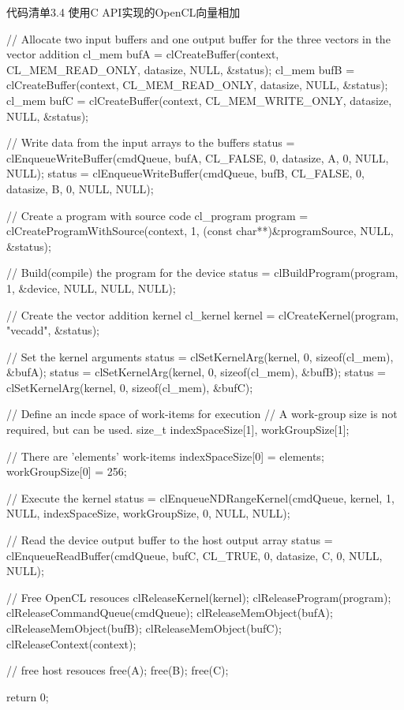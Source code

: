 \begin{codeboxt}[cpp]{代码清单3.4 使用C API实现的OpenCL向量相加}
{  // Allocate two input buffers and one output buffer for the three vectors in the vector addition
  cl_mem bufA = clCreateBuffer(context, CL_MEM_READ_ONLY, datasize, NULL, &status);
  cl_mem bufB = clCreateBuffer(context, CL_MEM_READ_ONLY, datasize, NULL, &status);
  cl_mem bufC = clCreateBuffer(context, CL_MEM_WRITE_ONLY, datasize, NULL, &status);

  // Write data from the input arrays to the buffers
  status = clEnqueueWriteBuffer(cmdQueue, bufA, CL_FALSE, 0, datasize, A, 0, NULL, NULL);
  status = clEnqueueWriteBuffer(cmdQueue, bufB, CL_FALSE, 0, datasize, B, 0, NULL, NULL);

  // Create a program with source code
  cl_program program = clCreateProgramWithSource(context, 1, (const char**)&programSource, NULL, &status);

  // Build(compile) the program for the device
  status = clBuildProgram(program, 1, &device, NULL, NULL, NULL);

  // Create the vector addition kernel
  cl_kernel kernel = clCreateKernel(program, "vecadd", &status);

  // Set the kernel arguments
  status = clSetKernelArg(kernel, 0, sizeof(cl_mem), &bufA);
  status = clSetKernelArg(kernel, 0, sizeof(cl_mem), &bufB);
  status = clSetKernelArg(kernel, 0, sizeof(cl_mem), &bufC);

  // Define an incde space of work-items for execution
  // A work-group size is not required, but can be used.
  size_t indexSpaceSize[1], workGroupSize[1];

  // There are 'elements' work-items
  indexSpaceSize[0] = elements;
  workGroupSize[0] = 256;

  // Execute the kernel
  status = clEnqueueNDRangeKernel(cmdQueue, kernel, 1, NULL, indexSpaceSize, workGroupSize, 0, NULL, NULL);

  // Read the device output buffer to the host output array
  status = clEnqueueReadBuffer(cmdQueue, bufC, CL_TRUE, 0, datasize, C, 0, NULL, NULL);

  // Free OpenCL resouces
  clReleaseKernel(kernel);
  clReleaseProgram(program);
  clReleaseCommandQueue(cmdQueue);
  clReleaseMemObject(bufA);
  clReleaseMemObject(bufB);
  clReleaseMemObject(bufC);
  clReleaseContext(context);

  // free host resouces
  free(A);
  free(B);
  free(C);

  return 0;
}
\end{codeboxt}



